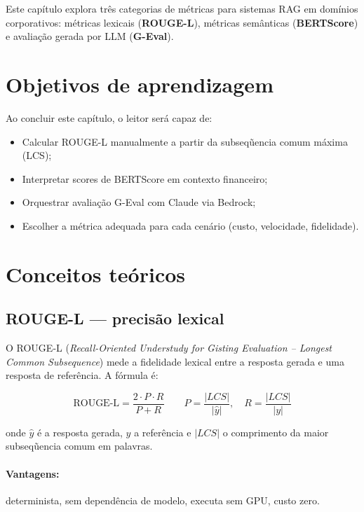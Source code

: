 Este cap\'itulo explora tr\^es categorias de m\'etricas para
sistemas RAG em dom\'inios corporativos: m\'etricas lexicais
(\textbf{ROUGE-L}), m\'etricas sem\^anticas (\textbf{BERTScore})
e avalia\c{c}\~ao gerada por LLM (\textbf{G-Eval}).

\section{Objetivos de aprendizagem}

Ao concluir este cap\'itulo, o leitor ser\'a capaz de:

\begin{itemize}[leftmargin=*]
  \item Calcular ROUGE-L manualmente a partir da subseq\~uencia
        comum m\'axima (LCS);
  \item Interpretar scores de BERTScore em contexto financeiro;
  \item Orquestrar avalia\c{c}\~ao G-Eval com Claude via Bedrock;
  \item Escolher a m\'etrica adequada para cada cen\'ario (custo,
        velocidade, fidelidade).
\end{itemize}

\section{Conceitos te\'oricos}

\subsection{ROUGE-L --- precis\~ao lexical}

O ROUGE-L (\textit{Recall-Oriented Understudy
for Gisting Evaluation -- Longest Common Subsequence}) mede a
fidelidade lexical entre a resposta gerada e uma resposta de
refer\^encia. A f\'ormula \'e:

$$\text{ROUGE-L} = \frac{2 \cdot P \cdot R}{P + R}
  \qquad P = \frac{|LCS|}{|\hat{y}|}, \quad R = \frac{|LCS|}{|y|}$$

onde $\hat{y}$ \'e a resposta gerada, $y$ a refer\^encia e
$|LCS|$ o comprimento da maior subseq\~uencia comum em palavras.

\paragraph{Vantagens:} determinista, sem depend\^encia de modelo,
executa sem GPU, custo zero.
